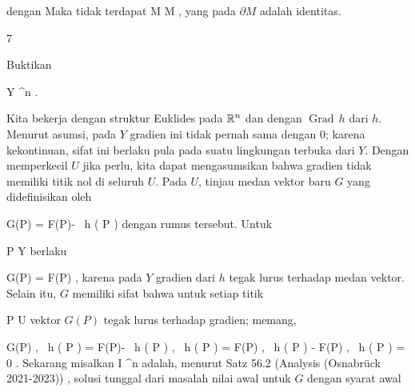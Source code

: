 {{ dengan
Maka tidak terdapat
\maabbdisp {\varphi} { M } { \partial M
} {,}
yang
pada $\partial M$ adalah identitas.}

 }



{7}

{

Buktikan
 {}

\mavergleichskette
{\vergleichskette
{ Y
}
{ \subseteq }{ \R^n
}
{  }{
}
{    }{
}
{   }{
}
}
{}{}{.}

}
{

Kita bekerja dengan struktur Euklides pada ${\mathbb R}^n$ dan dengan
$\operatorname{Grad} \,  h$ dari $h$. Menurut asumsi, pada $Y$ gradien ini tidak pernah sama dengan $0$; karena kekontinuan, sifat ini berlaku pula pada suatu lingkungan terbuka dari $Y$. Dengan memperkecil $U$ jika perlu, kita dapat mengasumsikan bahwa gradien tidak memiliki titik nol di seluruh $U$. Pada $U$, tinjau medan vektor baru $G$ yang didefinisikan oleh

\mavergleichskettedisp
{\vergleichskette
{ G(P)
}
{ =} { F(P)-  {  }
 \,  h  (  P )
}
{ } {
}
{ } {
}
{ } {
}
}
{}{}{}
dengan rumus tersebut. Untuk

\mavergleichskette
{\vergleichskette
{ P
}
{ \in }{ Y
}
{  }{
}
{    }{
}
{   }{
}
}
{}{}{}
berlaku

\mavergleichskette
{\vergleichskette
{ G(P)
}
{ = }{ F(P)
}
{  }{
}
{    }{
}
{   }{
}
}
{}{}{,}
karena pada $Y$ gradien dari $h$ tegak lurus terhadap medan vektor. Selain itu, $G$
 {} {}
memiliki sifat bahwa untuk setiap titik

\mavergleichskette
{\vergleichskette
{ P
}
{ \in }{ U
}
{  }{
}
{    }{
}
{   }{
}
}
{}{}{}
vektor $G(P)$ tegak lurus terhadap gradien; memang,

\mavergleichskettealignhandlinks
{\vergleichskettealignhandlinks
{ \left\langle  G(P) ,
 \,  h  (  P )   \right\rangle
}
{ =} { \left\langle  F(P)- {  }
 \,  h  (  P )  ,
 \,  h  (  P )   \right\rangle
}
{ =} { \left\langle  F(P) ,
 \,  h  (  P )   \right\rangle - \left\langle  F(P) ,
 \,  h  (  P )   \right\rangle
}
{ =} { 0
}
{ } {
}
}
{}
{}{.}
Sekarang misalkan
 { I} { \R^n
} {}
adalah, menurut
Satz 56.2 (Analysis (Osnabrück 2021-2023))
, solusi tunggal dari masalah nilai awal untuk $G$ dengan syarat awal

}

